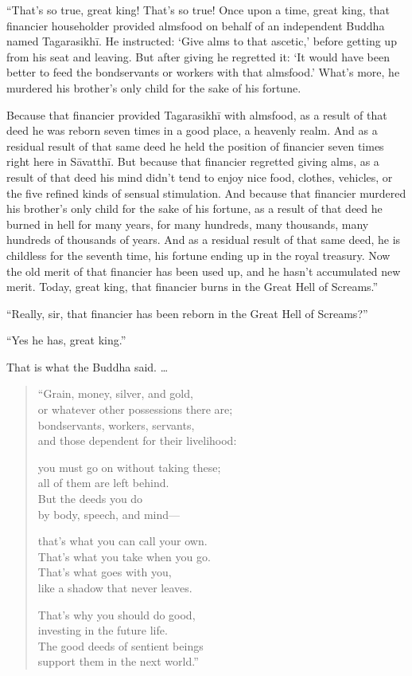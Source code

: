 \documentclass[12pt,openany]{book}%
\begin{document}
“That’s so true, great king! That’s so true! Once upon a time, great king, that financier householder provided almsfood on behalf of an independent Buddha named \textsanskrit{Tagarasikhī}. He instructed: ‘Give alms to that ascetic,’ before getting up from his seat and leaving. But after giving he regretted it: ‘It would have been better to feed the bondservants or workers with that almsfood.’ What’s more, he murdered his brother’s only child for the sake of his fortune. 

Because that financier provided \textsanskrit{Tagarasikhī} with almsfood, as a result of that deed he was reborn seven times in a good place, a heavenly realm. And as a residual result of that same deed he held the position of financier seven times right here in \textsanskrit{Sāvatthī}. But because that financier regretted giving alms, as a result of that deed his mind didn’t tend to enjoy nice food, clothes, vehicles, or the five refined kinds of sensual stimulation. And because that financier murdered his brother’s only child for the sake of his fortune, as a result of that deed he burned in hell for many years, for many hundreds, many thousands, many hundreds of thousands of years. And as a residual result of that same deed, he is childless for the seventh time, his fortune ending up in the royal treasury. Now the old merit of that financier has been used up, and he hasn’t accumulated new merit. Today, great king, that financier burns in the Great Hell of Screams.” 

“Really, sir, that financier has been reborn in the Great Hell of Screams?” 

“Yes he has, great king.” 

That is what the Buddha said. … 

\begin{verse}%
“Grain, money, silver, and gold, \\
or whatever other possessions there are; \\
bondservants, workers, servants, \\
and those dependent for their livelihood: 

you must go on without taking these; \\
all of them are left behind. \\
But the deeds you do \\
by body, speech, and mind—

that’s what you can call your own. \\
That’s what you take when you go. \\
That’s what goes with you, \\
like a shadow that never leaves. 

That’s why you should do good, \\
investing in the future life. \\
The good deeds of sentient beings \\
support them in the next world.” 

%
\end{verse}
\end{document}

